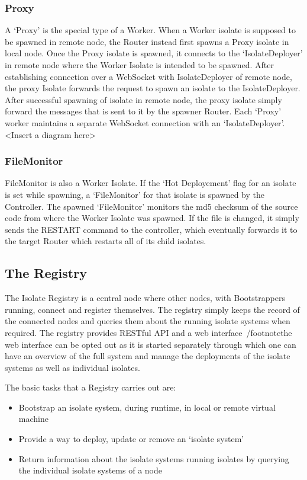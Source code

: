   \subsubsection{Proxy}
  A ‘Proxy’ is the special type of a Worker. When a Worker isolate is supposed to be spawned in remote node, the Router instead first spawns a Proxy isolate in local node. Once the Proxy isolate is spawned, it connects to the ‘IsolateDeployer’ in remote node where the Worker Isolate is intended to be spawned. After establishing connection over a WebSocket with IsolateDeployer of remote node, the proxy Isolate forwards the request to spawn an isolate to the IsolateDeployer. After successful spawning of isolate in remote node, the proxy isolate simply forward the messages that is sent to it by the spawner Router. Each ‘Proxy’ worker maintains a separate WebSocket connection with an ‘IsolateDeployer’.
  <Insert a diagram here>

  \subsubsection{FileMonitor}
  FileMonitor is also a Worker Isolate. If the ‘Hot Deployement’ flag for an isolate is set while spawning, a ‘FileMonitor’ for that isolate is spawned by the Controller. The spawned ‘FileMonitor’ monitors the md5 checksum of the source code from where the Worker Isolate was spawned. If the file is changed, it simply sends the RESTART command to the controller, which eventually forwards it to the target Router which restarts all of its child isolates.

\subsection{The Registry}
The Isolate Registry is a central node where other nodes, with Bootstrappers running, connect and register themselves. The registry simply keeps the record of the connected nodes and queries them about the running isolate systems when required. The registry provides RESTful API and a web interface~/footnote{the web interface can be opted out as it is started separately} through which one can have an overview of the full system and manage the deployments of the isolate systems as well as individual isolates.

The basic tasks that a Registry carries out are:
\begin{itemize}
  \item Bootstrap an isolate system, during runtime, in local or remote virtual machine
  \item Provide a way to deploy, update or remove an ‘isolate system’
  \item Return information about the isolate systems running isolates by querying the individual isolate systems of a node
\end{itemize}

